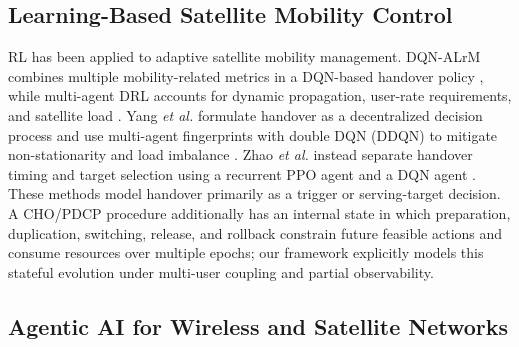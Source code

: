 \documentclass[journal]{IEEEtran}
\begin{document}
\subsection{Learning-Based Satellite Mobility Control}

RL has been applied to adaptive satellite mobility management. DQN-ALrM
combines multiple mobility-related metrics in a DQN-based handover policy
\cite{yang2023dqn}, while multi-agent DRL accounts for dynamic propagation,
user-rate requirements, and satellite load \cite{liu2024marlho}. Yang
\emph{et al.} formulate handover as a decentralized decision process and use
multi-agent fingerprints with double DQN (DDQN) to mitigate non-stationarity
and load imbalance \cite{yang2024fingerprints}. Zhao \emph{et al.} instead
separate handover timing and target selection using a recurrent PPO agent and
a DQN agent \cite{zhao2026hrl}. These methods model handover primarily as a
trigger or serving-target decision. A CHO/PDCP procedure additionally has an
internal state in which preparation, duplication, switching, release, and
rollback constrain future feasible actions and consume resources over multiple
epochs; our framework explicitly models this stateful evolution under
multi-user coupling and partial observability.

\subsection{Agentic AI for Wireless and Satellite Networks}
\end{document}
